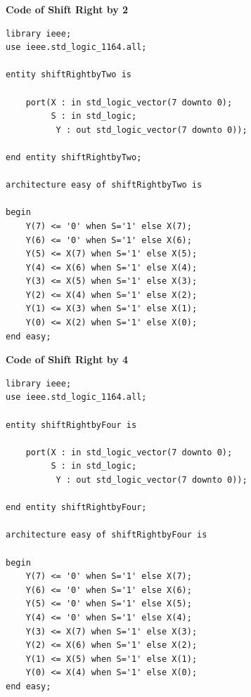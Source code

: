 \documentclass[12pt]{article}
\begin{document}
        \noindent
        \textbf{Code of Shift Right by 2}
        \noindent
        \begin{verbatim}
library ieee;
use ieee.std_logic_1164.all;

entity shiftRightbyTwo is

	port(X : in std_logic_vector(7 downto 0);
		 S : in std_logic;
		  Y : out std_logic_vector(7 downto 0));
		  
end entity shiftRightbyTwo;

architecture easy of shiftRightbyTwo is

begin
	Y(7) <= '0' when S='1' else X(7);
	Y(6) <= '0' when S='1' else X(6);
	Y(5) <= X(7) when S='1' else X(5);
	Y(4) <= X(6) when S='1' else X(4);
	Y(3) <= X(5) when S='1' else X(3);
	Y(2) <= X(4) when S='1' else X(2);
	Y(1) <= X(3) when S='1' else X(1);
	Y(0) <= X(2) when S='1' else X(0);
end easy;
        \end{verbatim}
        
        \noindent
        \textbf{Code of Shift Right by 4}
        \noindent
        \begin{verbatim}
library ieee;
use ieee.std_logic_1164.all;

entity shiftRightbyFour is

	port(X : in std_logic_vector(7 downto 0);
		 S : in std_logic;
		  Y : out std_logic_vector(7 downto 0));
		  
end entity shiftRightbyFour;

architecture easy of shiftRightbyFour is

begin
	Y(7) <= '0' when S='1' else X(7);
	Y(6) <= '0' when S='1' else X(6);
	Y(5) <= '0' when S='1' else X(5);
	Y(4) <= '0' when S='1' else X(4);
	Y(3) <= X(7) when S='1' else X(3);
	Y(2) <= X(6) when S='1' else X(2);
	Y(1) <= X(5) when S='1' else X(1);
	Y(0) <= X(4) when S='1' else X(0);
end easy;
        \end{verbatim}
\end{document}
